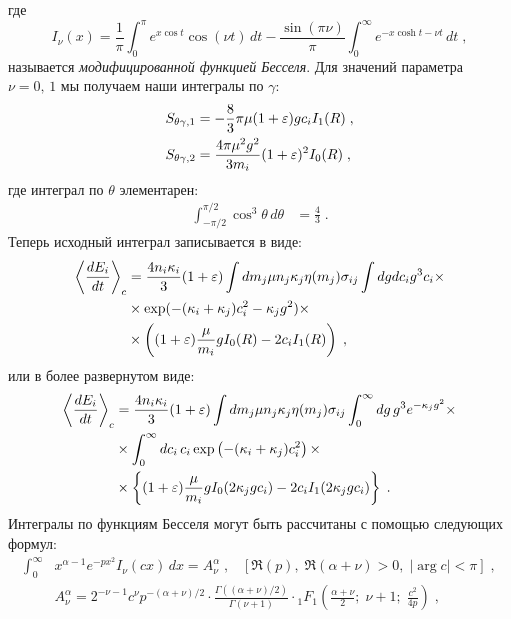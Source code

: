 где
\begin{equation}
  I_\nu(x) = \frac{1}{\pi}\int_{0}^{\pi}e^{x\cos t}\cos(\nu t)\,dt-\frac{\sin(\pi\nu)}{\pi}\int_{0}^{\infty}e^{-x\cosh t-\nu t}\,dt\;,
\end{equation}
называется \emph{модифицированной функцией Бесселя}. Для значений параметра $\nu=0,\,1$ мы получаем наши интегралы по $\gamma$:
\begin{equation}
  \begin{split}
    S_{\theta\gamma,1} &= -\frac{8}{3}\pi\mu(1+\varepsilon)gc_iI_1(R)\;,\\
    S_{\theta\gamma,2} &= \frac{4\pi\mu^2g^2}{3m_i}(1+\varepsilon)^2I_0(R)\;,
  \end{split}
\end{equation}
где интеграл по $\theta$ элементарен:
\begin{equation}
  \begin{split}    
    \int_{-\pi/2}^{\pi/2} \cos^3\theta\,d\theta &= \frac{4}{3}\;.
  \end{split}
\end{equation}
Теперь исходный интеграл записывается в виде:
\begin{equation}
  \begin{split}
    \left\langle\frac{dE_i}{dt}\right\rangle_c &= \frac{4n_i\kappa_i}{3}(1+\varepsilon)\int dm_j\mu n_j\kappa_j\eta(m_j)\sigma_{ij}
    \int dgdc_i g^3c_i\times\\
    &\times\exp(-(\kappa_i+\kappa_j)c^2_i-\kappa_jg^2)\times\\
    &\times\left((1+\varepsilon)\frac{\mu}{m_i}gI_0(R)-2c_iI_1(R)\right)\;,
  \end{split}
\end{equation}
или в более развернутом виде:
\begin{equation}
  \begin{split}
    \left\langle\frac{dE_i}{dt}\right\rangle_c &= \frac{4n_i\kappa_i}{3}(1+\varepsilon)\int dm_j\mu n_j\kappa_j\eta(m_j)\sigma_{ij}
    \int_{0}^{\infty}dg\,g^3e^{-\kappa_jg^2}\times\\
    &\times\int_{0}^{\infty}dc_i\,c_i\exp\left(-(\kappa_i+\kappa_j)c^2_i\right)\times\\
    &\times\left\{(1+\varepsilon)\frac{\mu}{m_i}gI_0(2\kappa_jgc_i)-2c_iI_1(2\kappa_jgc_i)\right\}\;.
  \end{split}
\end{equation}
Интегралы по функциям Бесселя могут быть рассчитаны с помощью следующих формул:
\begin{equation}
  \begin{split}
    \int_{0}^{\infty}&x^{\alpha-1}e^{-px^2}I_{\nu}(cx)\,dx = A^{\alpha}_{\nu}\;,\;\;\;\left[\Re(p),\;\Re(\alpha+\nu)>0,\;\vert\arg c\vert<\pi\right]\;,\\
    &A^{\alpha}_{\nu}=2^{-\nu-1}c^{\nu}p^{-(\alpha+\nu)/2}\cdot\frac{\Gamma((\alpha+\nu)/2)}{\Gamma(\nu+1)}\cdot
    \mbox{}_{1}F_{1}\left(\frac{\alpha+\nu}{2};\;\nu+1;\;\frac{c^2}{4p}\right)\;,
  \end{split}
\end{equation}
